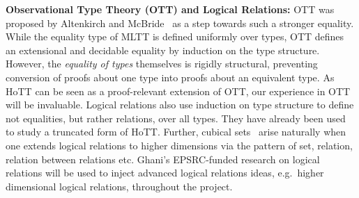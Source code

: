 \documentclass[a4paper,11pt]{article}
\newcommand{\eg}{{e.g.}\ }
\begin{document}
{\bf Observational Type Theory (OTT) and Logical Relations:} OTT was
proposed by Altenkirch and McBride~\cite{alti:ott-conf} as a step
towards such a stronger equality. While the equality type of MLTT is
defined uniformly over types, OTT defines an extensional and
decidable equality by induction on the type structure. However, the
{\em equality of types} themselves is rigidly structural, preventing 
conversion of proofs about one type into proofs about an equivalent type. As
HoTT can be seen as a proof-relevant extension of OTT, our experience
in OTT will be invaluable.
Logical relations also use induction on type structure
to define not equalities, but rather relations, over all
types. They have already been
used~\cite{licataHarper:canonicity2d} to study a truncated form of
HoTT. Further, cubical sets~\cite{BezemM:cubsmt} 
arise naturally when one extends logical
relations to higher dimensions via the pattern of set, relation,
relation between relations etc. Ghani's EPSRC-funded research on
logical relations will be used to inject advanced logical relations
ideas, \eg higher dimensional logical relations, throughout
the project.



\end{document}
